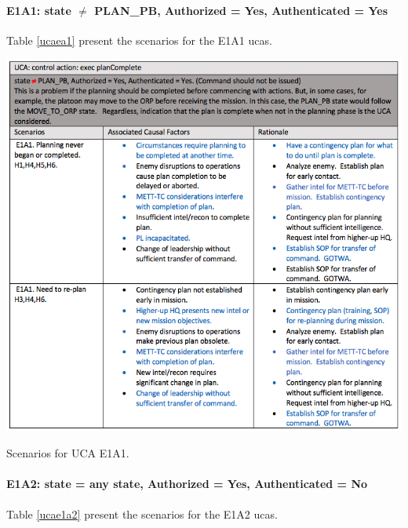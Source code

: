 \documentclass[../../main/main.tex]{subfiles}
\begin{document}
\paragraph*{E1A1: state  $\neq$ PLAN_PB, Authorized = Yes, Authenticated = Yes}
Table \ref{ucaea1}  present the scenarios for the E1A1 \glspl{uca}.

\begin{table}[ht!]
\begin{center}
\includegraphics[width=\linewidth]{../figures/ucaea1}
\caption{Scenarios for UCA E1A1.}
\label{ucaea1}
\end{center}
\end{table}
\clearpage

\paragraph*{E1A2: state  = any state, Authorized = Yes, Authenticated = No}
Table \ref{ucae1a2}  present the scenarios for the E1A2 \glspl{uca}.
\end{document}
